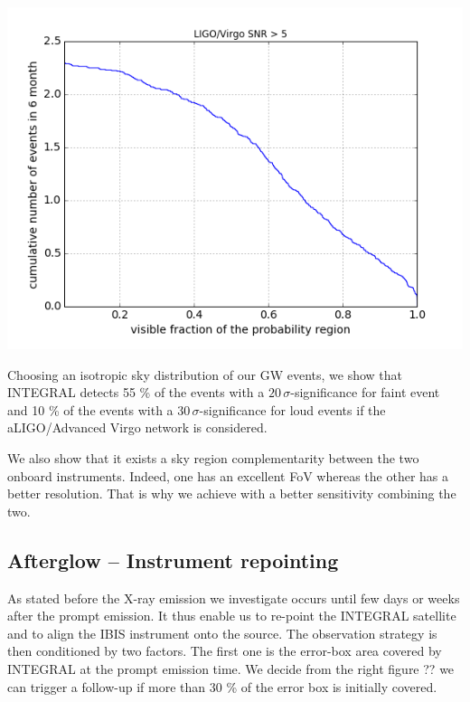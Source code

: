 \documentclass[a0,portrait]{a0poster}
\begin{document}
\begin{multicols}{2}
\begin{center}\vspace{.5cm}
    \includegraphics[scale=1.4]{figures/covered_region.png}
    \label{covered_region}
\end{center}

Choosing an isotropic sky distribution of our GW events, we show that INTEGRAL
detects 55 \% of the events with a $20 \, \sigma$-significance for faint event
and 10 \% of the events with a $30 \, \sigma$-significance for loud events if
the aLIGO/Advanced Virgo network is considered.

We also show that it exists a sky region complementarity between the two onboard
instruments. Indeed, one has an excellent FoV whereas the other has a better
resolution. That is why we achieve with a better sensitivity combining the two.

\subsection*{Afterglow -- Instrument repointing}

As stated before the X-ray emission we investigate occurs until few days or
weeks after the prompt emission. It thus enable us to re-point the INTEGRAL
satellite and to align the IBIS instrument onto the source. The observation
strategy is then conditioned by two factors. The first one is the error-box area
covered by INTEGRAL at the prompt emission time. We decide from the right figure
?? we can trigger a follow-up if more than 30 \% of the error box is initially
covered.


\end{multicols}
\end{document}
